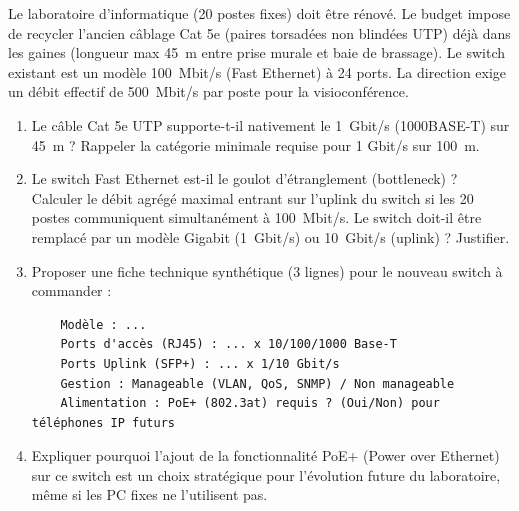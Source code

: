 \documentclass[11pt]{article}
\begin{document}
\begin{exercice}
Le laboratoire d'informatique (20 postes fixes) doit être rénové. Le budget impose de recycler l'ancien câblage Cat 5e (paires torsadées non blindées UTP) déjà dans les gaines (longueur max \SI{45}{m} entre prise murale et baie de brassage). Le switch existant est un modèle \SI{100}{Mbit/s} (Fast Ethernet) à 24 ports. La direction exige un débit effectif de \SI{500}{Mbit/s} par poste pour la visioconférence.

\begin{enumerate}
    \item Le câble Cat 5e UTP supporte-t-il nativement le \SI{1}{Gbit/s} (1000BASE-T) sur \SI{45}{m} ? Rappeler la catégorie minimale requise pour 1 Gbit/s sur \SI{100}{m}.
    \item Le switch Fast Ethernet est-il le goulot d'étranglement (bottleneck) ? Calculer le débit agrégé maximal entrant sur l'uplink du switch si les 20 postes communiquent simultanément à \SI{100}{Mbit/s}. Le switch doit-il être remplacé par un modèle Gigabit (\SI{1}{Gbit/s}) ou \SI{10}{Gbit/s} (uplink) ? Justifier.
    \item Proposer une fiche technique synthétique (3 lignes) pour le nouveau switch à commander :
    \begin{verbatim}
    Modèle : ...
    Ports d'accès (RJ45) : ... x 10/100/1000 Base-T
    Ports Uplink (SFP+) : ... x 1/10 Gbit/s
    Gestion : Manageable (VLAN, QoS, SNMP) / Non manageable
    Alimentation : PoE+ (802.3at) requis ? (Oui/Non) pour téléphones IP futurs
    \end{verbatim}
    \item Expliquer pourquoi l'ajout de la fonctionnalité \og PoE+ \fg (Power over Ethernet) sur ce switch est un choix stratégique pour l'évolution future du laboratoire, même si les PC fixes ne l'utilisent pas.
\end{enumerate}
\end{exercice}
\end{document}
